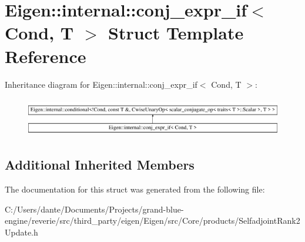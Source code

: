 \hypertarget{struct_eigen_1_1internal_1_1conj__expr__if}{}\section{Eigen\+::internal\+::conj\+\_\+expr\+\_\+if$<$ Cond, T $>$ Struct Template Reference}
\label{struct_eigen_1_1internal_1_1conj__expr__if}
Inheritance diagram for Eigen\+::internal\+::conj\+\_\+expr\+\_\+if$<$ Cond, T $>$\+:\begin{figure}[H]
\begin{center}
\leavevmode
\includegraphics[height=1.694402cm]{struct_eigen_1_1internal_1_1conj__expr__if}
\end{center}
\end{figure}
\subsection*{Additional Inherited Members}


The documentation for this struct was generated from the following file\+:\begin{DoxyCompactItemize}
\item 
C\+:/\+Users/dante/\+Documents/\+Projects/grand-\/blue-\/engine/reverie/src/third\+\_\+party/eigen/\+Eigen/src/\+Core/products/Selfadjoint\+Rank2\+Update.\+h\end{DoxyCompactItemize}
